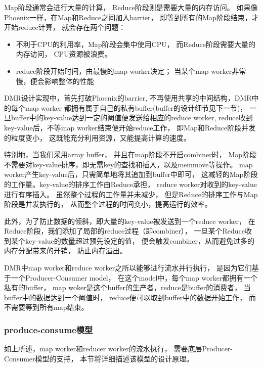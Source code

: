 Map阶段通常会进行大量的计算，
Reduce阶段则是需要大量的内存访问。
如果像Phoenix一样，在Map和Reduce之间加入barrier，
即等到所有的Map阶段结束，才开始reduce计算，
就会存在两个问题：
\begin{itemize}
  \item 不利于CPU的利用率，Map阶段会集中使用CPU，
  而Reduce阶段需要大量的内存访问，
  CPU资源被浪费。
  \item reduce阶段开始时间，由最慢的map worker决定；
  当某个map worker非常慢，便会影响整体的性能
\end{itemize}

DMR设计实现中，首先打破Phoenix的barrier,
不再使用共享的中间结构，DMR中的每个map worker
都拥有属于自己的私有buffer(buffer的设计细节见下一节)，
一旦buffer中的key-value达到一定的阈值便发送给相应的reduce worker,
reduce收到key-value后，不等map worker结束便开始reduce工作，
即Map和Reduce阶段并发的粒度变小，
这既能充分利用资源，又能提高计算的速度。

特别地，当我们采用array buffer，
并且在map阶段不开启combiner时，
Map阶段不需要对key-value排序，即无需key的查找和插入，以及memmove等操作。
map worker产生key-value后，只需简单地将其追加到buffer中即可，
这减轻的Map阶段的工作量。key-value的排序工作由Reduce承担，
reduce worker对收到的key-value进行有序插入。
虽然整个过程的工作量并未减少，
但是Reduce的排序工作与Map阶段是并发执行的，
从而整个过程的时间变小，提高运行的效率。

此外，为了防止数据的倾斜，即大量的key-value被发送到一个reduce worker，
在Reduce阶段，我们添加了局部的reduce过程（即combiner），
一旦某个Reduce收到某个key-value的数量超过预先设定的值，
便会触发combiner，从而避免过多的内存分配带来的开销，
防止内存溢出。

DMR中map worker和reduce worker之所以能够进行流水并行执行，
是因为它们基于一个Producer-Consumer model，
在这个model中，每个map worker都拥有一个私有的buffer，
map woker是这个buffer的生产者，reduce是buffer的消费者，
当buffer中的数据达到一个阈值时，
reduce便可以取到buffer中的数据开始工作，
而不需要等到所有map结束。



\subsubsection{produce-consume模型}
如上所述，map worker和reducer worker的流水执行，
需要底层Producer-Consumer模型的支持，
本节将详细描述该模型的设计原理。

